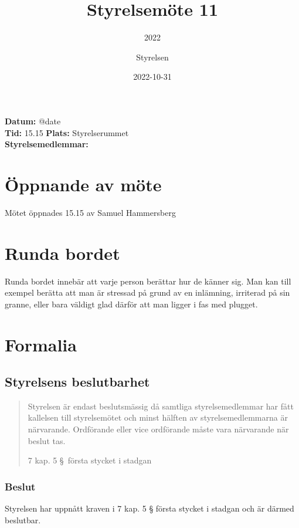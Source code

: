 \documentclass[protokoll]{dvd}
\begin{document}
\title{Styrelsemöte 11}
\subtitle{2022}
\author{Styrelsen}
\date{2022-10-31}

\textbf{Datum:} \csname @date\endcsname\\
\textbf{Tid:} 15.15
\textbf{Plats:} Styrelserummet\\
\textbf{Styrelsemedlemmar:}
\begin{närvarande_förtroendevalda}
\end{närvarande_förtroendevalda}

\section{Öppnande av möte}

Mötet öppnades 15.15 av Samuel Hammersberg

\section{Runda bordet}

Runda bordet innebär att varje person berättar hur de känner sig.
Man kan till exempel berätta att man är stressad på grund av en inlämning,
irriterad på sin granne, eller bara väldigt glad därför att man ligger i fas med plugget.

\section{Formalia}

\subsection{Styrelsens beslutbarhet}

\blockquote[7 kap. 5 \S~första stycket i stadgan][]{
    Styrelsen är endast beslutsmässig då samtliga styrelsemedlemmar har
    fått kallelsen till styrelsemötet och minst hälften av styrelsemedlemmarna är närvarande.
    Ordförande eller vice ordförande måste vara närvarande när beslut tas.
}

\subsubsection*{Beslut}

\begin{attsatser}
    \item Styrelsen har uppnått kraven i 7 kap.
          5 § första stycket i stadgan och är därmed beslutbar.
\end{attsatser}
\end{document}
